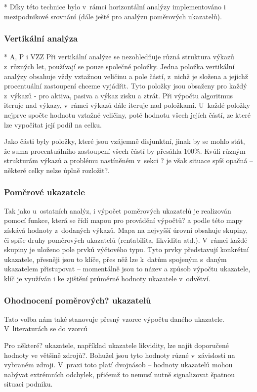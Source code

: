 * Díky této technice bylo v~rámci horizontální analýzy implementováno i mezipodnikové srovnání (dále ještě pro analýzu poměrových ukazatelů).

\subsubsection{Vertikální analýza}
* A, P i VZZ
Při vertikální analýze se nezohledňuje různá struktura výkazů z~různých let, používají se pouze společné položky. Jedna položka vertikální analýzy obsahuje vždy vztažnou veličinu a pole částí, z~nichž je složena a jejichž procentuální zastoupení chceme vyjádřit. Tyto položky jsou obsaženy pro každý z~výkazů - pro aktiva, pasiva a výkaz zisku a ztrát. Při výpočtu algoritmus iteruje nad výkazy, v~rámci výkazů dále iteruje nad položkami. U~každé položky nejprve spočte hodnotu vztažné veličiny, poté hodnotu všech jejích částí, ze které lze vypočítat její podíl na celku.

Jako části byly položky, které jsou vzájemně disjunktní, jinak by se mohlo stát, že suma procentuálního zastoupení všech částí by přesáhla 100\%. Kvůli různým strukturám výkazů a problému nastíněném v~sekci ? je však situace spíš opačná -- některé celky nelze úplně rozložit?.

\subsubsection{Poměrové ukazatele}
Tak jako u~ostatních analýz, i výpočet poměrových ukazatelů je realizován pomocí funkce, která se řídí mapou pro provádění výpočtů? a podle této mapy získává hodnoty z~dodaných výkazů. Mapa na nejvyšší úrovni obsahuje skupiny, či spíše druhy poměrových ukazatelů (rentabilita, likvidita atd.). V~rámci každé skupiny je uloženo pole prvků výčtového typu. Tyto prvky představují konkrétní ukazatele, přesněji jsou to klíče, přes něž lze k~datům spojeným s~daným ukazatelem přistupovat -- momentálně jsou to název a způsob výpočtu ukazatele, klíč je využíván i ke zjištění průměrné hodnoty ukazatele v~odvětví.


\subsubsection{Ohodnocení poměrových? ukazatelů}

Tato volba nám také stanovuje přesný vzorec výpočtu daného ukazatele. V~literaturách se do vzorců 

Pro některé? ukazatele, například ukazatele likvidity, lze najít doporučené hodnoty ve většině zdrojů?. Bohužel jsou tyto hodnoty různé v~závislosti na vybraném zdroji. V~praxi toto platí dvojnásob -- hodnoty ukazatelů mohou nabývat extrémních odchylek, přičemž to nemusí nutně signalizovat špatnou situaci podniku. 

